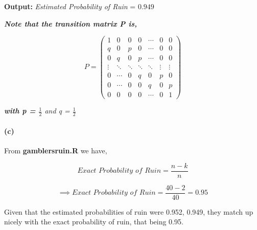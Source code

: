 \documentclass[hidelinks]{article}
\begin{document}
\noindent\textbf{Output:} \textit{Estimated {Probability of Ruin}} = \(\boxed{0.949}\)

\smallskip

\noindent \textit{\textbf{Note that the transition matrix P is,}}

\[
P =
\begin{pmatrix}
1      & 0      & 0      & 0      & \cdots & 0      & 0 \\
q      & 0      & p      & 0      & \cdots & 0      & 0 \\
0      & q      & 0      & p      & \cdots & 0      & 0 \\
\vdots & \ddots & \ddots & \ddots & \ddots & \vdots & \vdots \\
0      & \cdots & 0      & q      & 0      & p      & 0 \\
0      & \cdots & 0      & 0      & q      & 0      & p \\
0      & 0      & 0      & 0      & \cdots & 0      & 1
\end{pmatrix}
\]

\noindent \textit{\textbf{with p = $\frac{1}{2}$} and q = $\frac{1}{2}$}

\paragraph{(c)} From \textbf{gamblersruin.R} we have,

\[
\textit{Exact Probability of Ruin} = \frac{n-k}{n}
\]

\[
\implies \textit{Exact Probability of Ruin} = \frac{40-2}{40} = \boxed{0.95}
\]

\noindent Given that the estimated probabilities of ruin were 0.952, 0.949, they match up nicely with the exact probability of ruin, that being 0.95.
\end{document}
